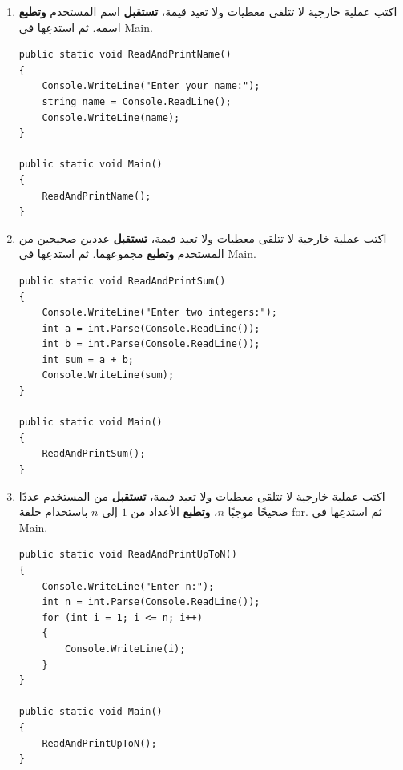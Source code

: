 \documentclass[14pt]{extarticle}
\begin{document}
\begin{enumerate}[itemsep=1em]

\item اكتب عملية خارجية لا تتلقى معطيات ولا تعيد قيمة، \textbf{تستقبل} اسم المستخدم \textbf{وتطبع} اسمه. ثم استدعِها في \textenglish{Main}.
\ifwithsols
\begin{boxSolution}
\begin{english}
\begin{verbatim}
public static void ReadAndPrintName()
{
    Console.WriteLine("Enter your name:");
    string name = Console.ReadLine();
    Console.WriteLine(name);
}

public static void Main()
{
    ReadAndPrintName();
}
\end{verbatim}
\end{english}
\end{boxSolution}
\fi
\filbreak

\item اكتب عملية خارجية لا تتلقى معطيات ولا تعيد قيمة، \textbf{تستقبل} عددين صحيحين من المستخدم \textbf{وتطبع} مجموعهما. ثم استدعِها في \textenglish{Main}.
\ifwithsols
\begin{boxSolution}
\begin{english}
\begin{verbatim}
public static void ReadAndPrintSum()
{
    Console.WriteLine("Enter two integers:");
    int a = int.Parse(Console.ReadLine());
    int b = int.Parse(Console.ReadLine());
    int sum = a + b;
    Console.WriteLine(sum);
}

public static void Main()
{
    ReadAndPrintSum();
}
\end{verbatim}
\end{english}
\end{boxSolution}
\fi
\filbreak

\item اكتب عملية خارجية لا تتلقى معطيات ولا تعيد قيمة، \textbf{تستقبل} من المستخدم عددًا صحيحًا موجبًا $n$، \textbf{وتطبع} الأعداد من $1$ إلى $n$ باستخدام حلقة \textenglish{for}. ثم استدعِها في \textenglish{Main}.
\ifwithsols
\begin{boxSolution}
\begin{english}
\begin{verbatim}
public static void ReadAndPrintUpToN()
{
    Console.WriteLine("Enter n:");
    int n = int.Parse(Console.ReadLine());
    for (int i = 1; i <= n; i++)
    {
        Console.WriteLine(i);
    }
}

public static void Main()
{
    ReadAndPrintUpToN();
}
\end{verbatim}
\end{english}
\end{boxSolution}
\fi
\filbreak

\end{enumerate}
\end{document}
